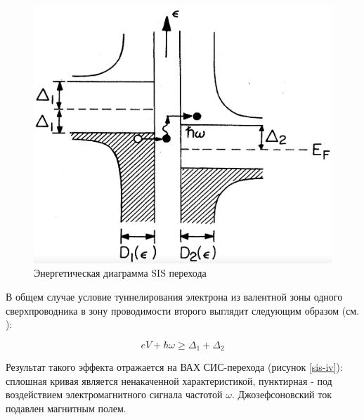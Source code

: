 \documentclass[12pt,a4paper]{article}
\begin{document}
\begin{figure}[H]
    \centering
    \includegraphics[scale = 0.27]{Diagram.png}
    \caption{Энергетическая диаграмма SIS перехода}
    \label{hf}
\end{figure}

В общем случае условие туннелирования электрона из валентной зоны одного сверхпроводника в зону проводимости второго выглядит следующим образом (см. \cite{Tucker}):

\begin{equation}
    eV + \hbar \omega \geq \Delta_1 + \Delta_2
\end{equation}

Результат такого эффекта отражается на ВАХ СИС-перехода (рисунок \ref{sis-iv}): сплошная кривая является ненакаченной характеристикой, пунктирная - под воздействием электромагнитного сигнала частотой {$\omega$}. Джозефсоновский ток подавлен магнитным полем.
\end{document}
